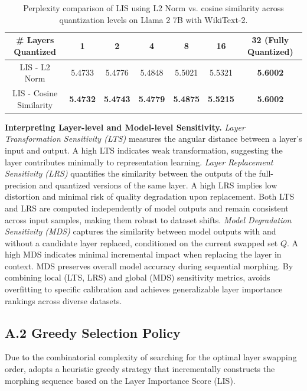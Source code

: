 \begin{table}[h]
\caption{Perplexity comparison of LIS using L2 Norm vs. cosine similarity across quantization levels on
Llama 2 7B with WikiText-2.}\label{table:cosine_l2}
\centering
\begin{tabular}{|c|c|c|c|c|c|c|}
\hline
\# Layers Quantized & 1 & 2 & 4 & 8 & 16 & 32 (Fully Quantized) \\ \hline
LIS - L2 Norm & 5.4733 & 5.4776 & 5.4848 & 5.5021 & 5.5321 & \textbf{5.6002} \\ \hline
LIS - Cosine Similarity & \textbf{5.4732} & \textbf{5.4743} & \textbf{5.4779} & \textbf{5.4875} & \textbf{5.5215} & \textbf{5.6002} \\ \hline
\end{tabular}
\end{table}


\noindent\textbf{Interpreting Layer-level and Model-level Sensitivity.} 
\textit{Layer Transformation Sensitivity (LTS)} measures the angular distance between a layer's input and output. A high LTS indicates weak transformation, suggesting the layer contributes minimally to representation learning.  
\textit{Layer Replacement Sensitivity (LRS)} quantifies the similarity between the outputs of the full-precision and quantized versions of the same layer. A high LRS implies low distortion and minimal risk of quality degradation upon replacement. Both LTS and LRS are computed independently of model outputs and remain consistent across input samples, making them robust to dataset shifts.  
\textit{Model Degradation Sensitivity (MDS)} captures the similarity between model outputs with and without a candidate layer replaced, conditioned on the current swapped set $Q$. A high MDS indicates minimal incremental impact when replacing the layer in context. MDS preserves overall model accuracy during sequential morphing.  
By combining local (LTS, LRS) and global (MDS) sensitivity metrics, {\system} avoids overfitting to specific calibration and achieves generalizable layer importance rankings across diverse datasets.

\subsection*{A.2 \quad Greedy Selection Policy}
Due to the combinatorial complexity of searching for the optimal layer swapping order, {\system} adopts a heuristic greedy strategy that incrementally constructs the morphing sequence based on the Layer Importance Score (LIS).


